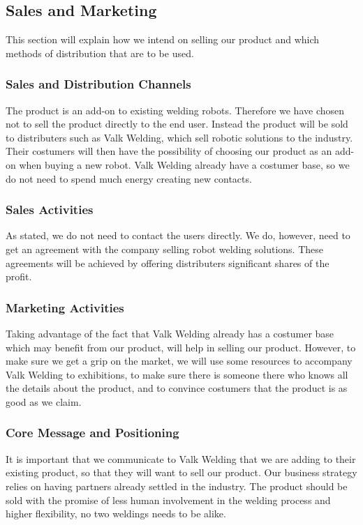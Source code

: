 \subsection{Sales and Marketing}
This section will explain how we intend on selling our product and which methods of distribution that are to be used.
\subsubsection{Sales and Distribution Channels}
The product is an add-on to existing welding robots. Therefore we have chosen not to sell the product directly to the end user. 
Instead the product will be sold to distributers such as Valk Welding, which sell robotic solutions to the industry. 
Their costumers will then have the possibility of choosing our product as an add-on when buying a new robot.
Valk Welding already have a costumer base, so we do not need to spend much energy creating new contacts. 
\subsubsection{Sales Activities}
As stated, we do not need to contact the users directly. 
We do, however, need to get an agreement with the company selling robot welding solutions.
These agreements will be achieved by offering distributers significant shares of the profit.
\subsubsection{Marketing Activities}
Taking advantage of the fact that Valk Welding already has a costumer base which may benefit from our product, will help in selling our product.
However, to make sure we get a grip on the market, we will use some resources to accompany Valk Welding to exhibitions, to make sure there is someone there who knows all the details about the product, and to convince costumers that the product is as good as we claim. 
\subsubsection{Core Message and Positioning}
It is important that we communicate to Valk Welding that we are adding to their existing product, so that they will want to sell our product. Our business strategy relies on having partners already settled in the industry.
The product should be sold with the promise of less human involvement in the welding process and higher flexibility, no two weldings needs to be alike.
